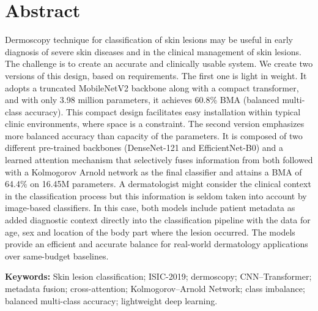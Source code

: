 \section*{Abstract}

Dermoscopy technique for classification of skin lesions may be useful in early
diagnosis of severe skin diseases and in the clinical management of skin
lesions. The challenge is to create an accurate and clinically usable system.
We create two versions of this design, based on requirements. The first one is
light in weight. It adopts a truncated MobileNetV2 backbone along with a compact
transformer, and with only 3.98 million parameters, it achieves 60.8\% BMA
(balanced multi-class accuracy). This compact design facilitates easy
installation within typical clinic environments, where space is a constraint.
The second version emphasizes more balanced accuracy than capacity of the
parameters. It is composed of two different pre-trained backbones
(DenseNet-121 and EfficientNet-B0) and a learned attention mechanism that
selectively fuses information from both followed with a Kolmogorov Arnold
network as the final classifier and attains a BMA of 64.4\% on 16.45M
parameters. A dermatologist might consider the clinical context in the
classification process but this information is seldom taken into account by
image-based classifiers. In this case, both models include patient metadata as
added diagnostic context directly into the classification pipeline with the
data for age, sex and location of the body part where the lesion occurred. The
models provide an efficient and accurate balance for real-world dermatology
applications over same-budget baselines.

\vspace{1cm}
\textbf{Keywords:} Skin lesion classification; ISIC-2019; dermoscopy;
CNN--Transformer; metadata fusion; cross-attention; Kolmogorov--Arnold Network;
class imbalance; balanced multi-class accuracy; lightweight deep learning.
\pagebreak
